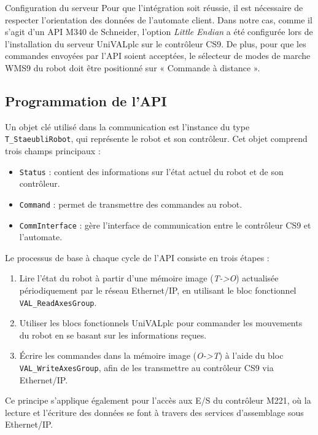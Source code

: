 \begin{UPSTIinfor}{Configuration du serveur}
Pour que l'intégration soit réussie, il est nécessaire de respecter l'orientation des données de l'automate client. Dans notre cas, comme il s'agit d'un API M340 de Schneider, l'option \textit{Little Endian} a été configurée lors de l'installation du serveur UniVALplc sur le contrôleur CS9. De plus, pour que les commandes envoyées par l'API soient acceptées, le sélecteur de modes de marche WMS9 du robot doit être positionné sur « Commande à distance ».
\end{UPSTIinfor}

\subsection{Programmation de l'API}
Un objet clé utilisé dans la communication est l'instance du type \texttt{T\_StaeubliRobot}, qui représente le robot et son contrôleur. Cet objet comprend trois champs principaux :
\begin{itemize}
    \item \texttt{Status} : contient des informations sur l'état actuel du robot et de son contrôleur.
    \item \texttt{Command} : permet de transmettre des commandes au robot.
    \item \texttt{CommInterface} : gère l'interface de communication entre le contrôleur CS9 et l'automate.
\end{itemize}

Le processus de base à chaque cycle de l'API consiste en trois étapes :
\begin{enumerate}
    \item Lire l'état du robot à partir d'une mémoire image (\textit{T->O}) actualisée périodiquement par le réseau Ethernet/IP, en utilisant le bloc fonctionnel \texttt{VAL\_ReadAxesGroup}.
    \item Utiliser les blocs fonctionnels UniVALplc pour commander les mouvements du robot en se basant sur les informations reçues.
    \item Écrire les commandes dans la mémoire image (\textit{O->T}) à l'aide du bloc \texttt{VAL\_WriteAxesGroup}, afin de les transmettre au contrôleur CS9 via Ethernet/IP.
\end{enumerate}

Ce principe s'applique également pour l'accès aux E/S du contrôleur M221, où la lecture et l'écriture des données se font à travers des services d'assemblage sous Ethernet/IP.
